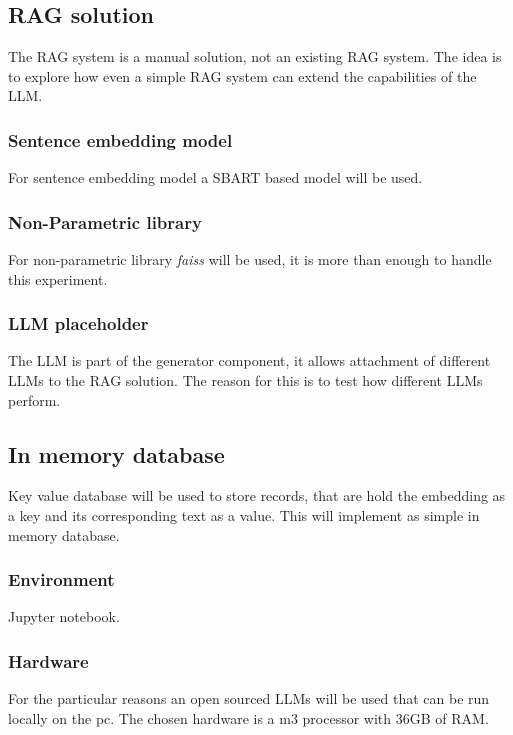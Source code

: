 \documentclass{wseas}
\begin{document}
\newpage

\subsection{RAG solution}

The RAG system is a manual solution, not an existing RAG system.
The idea is to explore how even a simple RAG system can extend the
capabilities of the LLM.

\subsubsection{Sentence embedding model}

For sentence embedding model a SBART based model will be used.

\subsubsection{Non-Parametric library}

For non-parametric library \textit{faiss} will be used, it is more than
enough to handle this experiment.

\subsubsection{LLM placeholder}

The LLM is part of the generator component, it allows attachment of 
different LLMs to the RAG solution. The reason for this is to test 
how different LLMs perform.

\subsection{In memory database}
Key value database will be used to store records, that are hold the embedding as a key
and its corresponding text as a value. This will implement as simple in memory database.
\subsubsection{Environment}

Jupyter notebook.

\subsubsection{Hardware}

For the particular reasons an open sourced LLMs will be used that can be
run locally on the pc. The chosen hardware is a m3 processor with 36GB
of RAM.
\end{document}
